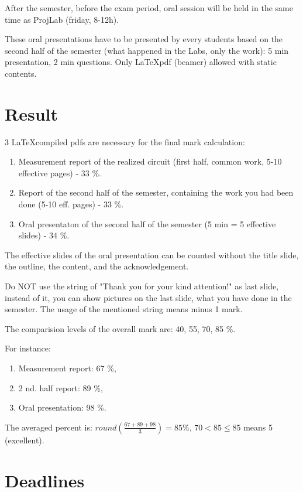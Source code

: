 After the semester, before the exam period, oral session will be held in the same time as ProjLab (friday, 8-12h).

These oral presentations have to be presented by every students based on the second half of the semester (what happened in the Labs, only the work): 5 min presentation, 2 min questions. Only \LaTeX pdf (beamer) allowed with static contents.

\section{Result}

3 \LaTeX compiled pdfs are necessary for the final mark calculation:

\begin{enumerate}
\item Measurement report of the realized circuit (first half, common work, 5-10 effective pages) - 33 \%.
\item Report of the second half of the semester, containing the work you had been done (5-10 eff. pages) - 33 \%.
\item Oral presentaton of the second half of the semester (5 min = 5 effective slides) - 34 \%.
\end{enumerate}

The effective slides of the oral presentation can be counted without the title slide, the outline, the content, and the acknowledgement.

Do NOT use the string of "Thank you for your kind attention!" as last slide, instead of it, you can show pictures on the last slide, what you have done in the semester. The usage of the mentioned string means minus 1 mark.  

The comparision levels of the overall mark are: 40, 55, 70, 85 \%.

For instance:

\begin{enumerate}
\item Measurement report: 67 \%,
\item 2 nd. half report: 89 \%,
\item Oral presentation: 98 \%.
\end{enumerate}

The averaged percent is: $ round( \frac{67+89+98}{3} ) = 85 \% $, $ 70 < 85 \leq 85$ means 5 (excellent).

\section{Deadlines}

